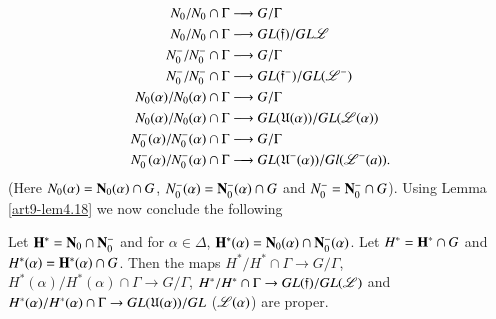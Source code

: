\begin{align*}
N_0 / N_0 \cap \Gamma & \longrightarrow G / \Gamma\\
N_0 / N_0 \cap \Gamma & \longrightarrow GL (\mathfrak{f}) / GL \mathscr{L}\\
N^-_0 / N^-_0 \cap \Gamma & \longrightarrow G/ \Gamma\\
N^-_0 / N^-_0 \cap \Gamma & \longrightarrow G L (\mathfrak{f}^-) /GL (\mathscr{L}^-)\\
N_0 (\alpha)/ N_0 (\alpha) \cap \Gamma & \longrightarrow G/ \Gamma\\
N_0 (\alpha) / N_0 (\alpha) \cap \Gamma & \longrightarrow GL (\mathfrak{U}(\alpha)) / GL (\mathscr{L}(\alpha))\\
N^-_0 (\alpha) / N^-_0 (\alpha) \cap \Gamma & \longrightarrow G/ \Gamma\\
N^-_0 (\alpha) / N^-_0 (\alpha) \cap \Gamma & \longrightarrow GL (\mathfrak{U}^-(\alpha)) / Gl (\mathscr{L}^- (a)).
\end{align*}\pageoriginale
(Here $N_0 (\alpha) = \mathbf{N}_0 (\alpha) \cap G$, $N^-_0 (\alpha) = \mathbf{N}^-_0 (\alpha) \cap G$ and $N^-_0 = \mathbf{N}^-_0 \cap G$). Using Lemma \ref{art9-lem4.18} we now conclude the following

\setcounter{definition}{28}
\begin{lemma}\label{art9-lem4.29}
Let $\mathbf{H}^\ast = \mathbf{N}_0 \cap \mathbf{N}^-_0$ and for $\alpha \in \Delta$, $\mathbf{H}^\ast (\alpha) = \mathbf{N}_0 (\alpha) \cap \mathbf{N}^-_0 (\alpha)$. Let $H^\ast = \mathbf{H}^\ast \cap G$ and $H^\ast (\alpha) = \mathbf{H}^\ast (\alpha) \cap G$. Then the maps $H^\ast / H^\ast \cap \Gamma \to G/\Gamma$, $H^\ast (\alpha)/H^\ast (\alpha) \cap \Gamma \to G/ \Gamma$, $H^\ast/H^\ast \cap \Gamma \to G L(\mathfrak{f})/GL (\mathscr{L})$ and $H^\ast (\alpha)/H^\ast (\alpha) \cap \Gamma \to GL (\mathfrak{U} (\alpha)) / GL $  ($\mathscr{L}(\alpha)$) are proper.
\end{lemma}

\setcounter{subsection}{29}

